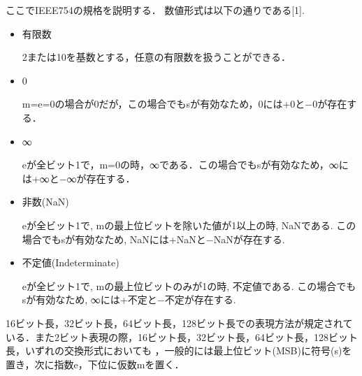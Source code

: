 \documentclass[a4j]{jsarticle}  %
\begin{document}
ここでIEEE754の規格を説明する．
数値形式は以下の通りである[1].
\begin{itemize}
\item 有限数

2または10を基数とする，任意の有限数を扱うことができる．
\item 0

m=e=0の場合が0だが，この場合でもsが有効なため，0には+0と−0が存在する．
\item ∞

eが全ビット1で，m=0の時，∞である．この場合でもsが有効なため，∞には+∞と−∞が存在する．
\item 非数(NaN)

eが全ビット1で, mの最上位ビットを除いた値が1以上の時, NaNである. この場合でもsが有効なため, NaNには+NaNと−NaNが存在する. 
\item 不定値(Indeterminate)

eが全ビット1で, mの最上位ビットのみが1の時, 不定値である. この場合でもsが有効なため, ∞には+不定と−不定が存在する. 
\end{itemize}
16ビット長，32ビット長，64ビット長，128ビット長での表現方法が規定されている．また2ビット表現の際，16ビット長，32ビット長，64ビット長，128ビット長，いずれの交換形式においても
，一般的には最上位ビット(MSB)に符号(s)を置き，次に指数e，下位に仮数mを置く．
\end{document}
